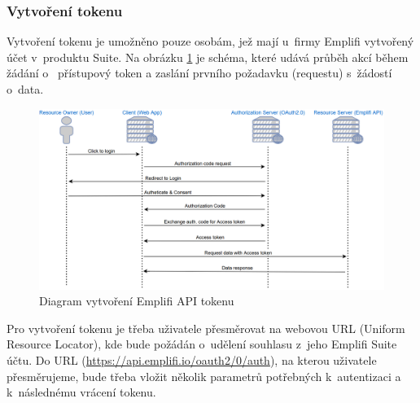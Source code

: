 \documentclass[czech, bc, kiv, he, iso690numb]{fasthesis}
\begin{document}
\subsubsection{Vytvoření tokenu}

Vytvoření tokenu je umožněno pouze osobám, jež mají u~firmy Emplifi vytvořený účet v~produktu Suite. Na obrázku \ref{fig:emplifAPIDiagram} je schéma, které udává průběh akcí během žádání o~
přístupový token a zaslání prvního požadavku (requestu) s~žádostí o~data.
\begin{figure}
	\centering
	\includegraphics[width=1\textwidth]{pictures/emplifiAPI.png}
	\caption{Diagram vytvoření Emplifi API tokenu \cite{emplifiDocs}}
	\label{fig:emplifAPIDiagram}
\end{figure}

Pro vytvoření tokenu je třeba uživatele přesměrovat na webovou URL (Uniform Resource Locator), kde bude požádán o~udělení souhlasu z~jeho Emplifi Suite účtu.
Do URL (\url{https://api.emplifi.io/oauth2/0/auth}), na kterou uživatele přesměrujeme, bude třeba vložit několik parametrů potřebných k~autentizaci a k~následnému vrácení tokenu. 
\end{document}
